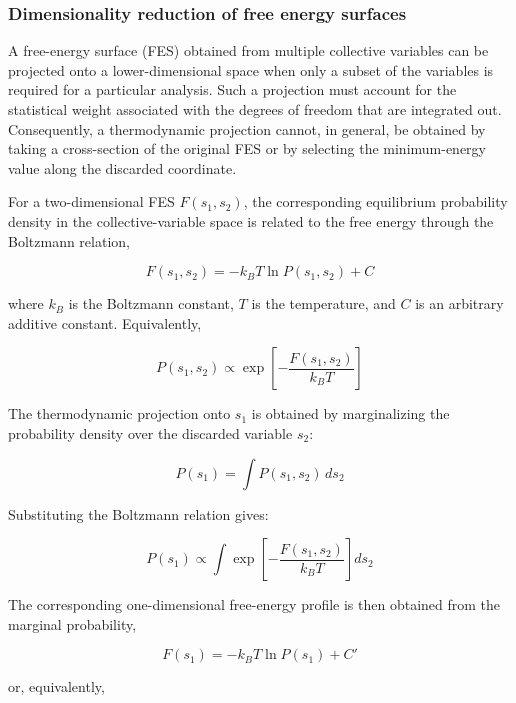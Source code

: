 \subsubsection{Dimensionality reduction of free energy surfaces}

A free-energy surface (FES) obtained from multiple collective variables can be projected onto a lower-dimensional space when only a subset of the variables is required for a particular analysis. Such a projection must account for the statistical weight associated with the degrees of freedom that are integrated out. Consequently, a thermodynamic projection cannot, in general, be obtained by taking a cross-section of the original FES or by selecting the minimum-energy value along the discarded coordinate.

For a two-dimensional FES $F(s_1,s_2)$, the corresponding equilibrium probability density in the collective-variable space is related to the free energy through the Boltzmann relation,

\begin{equation}
F(s_1,s_2) = -k_B T \ln P(s_1,s_2) + C
\end{equation}

where $k_B$ is the Boltzmann constant, $T$ is the temperature, and $C$ is an arbitrary additive constant. Equivalently,

\begin{equation}
P(s_1,s_2)
\propto
\exp\left[
-\frac{F(s_1,s_2)}{k_B T}
\right]
\end{equation}

The thermodynamic projection onto $s_1$ is obtained by marginalizing the probability density over the discarded variable $s_2$:

\begin{equation}
P(s_1) = \int P(s_1,s_2)\,ds_2
\end{equation}

Substituting the Boltzmann relation gives:

\begin{equation}
P(s_1)
\propto
\int
\exp\left[
-\frac{F(s_1,s_2)}{k_B T}
\right]
ds_2
\end{equation}

The corresponding one-dimensional free-energy profile is then obtained from the marginal probability,

\begin{equation}
F(s_1) = -k_B T\ln P(s_1)+C'
\end{equation}

or, equivalently,

